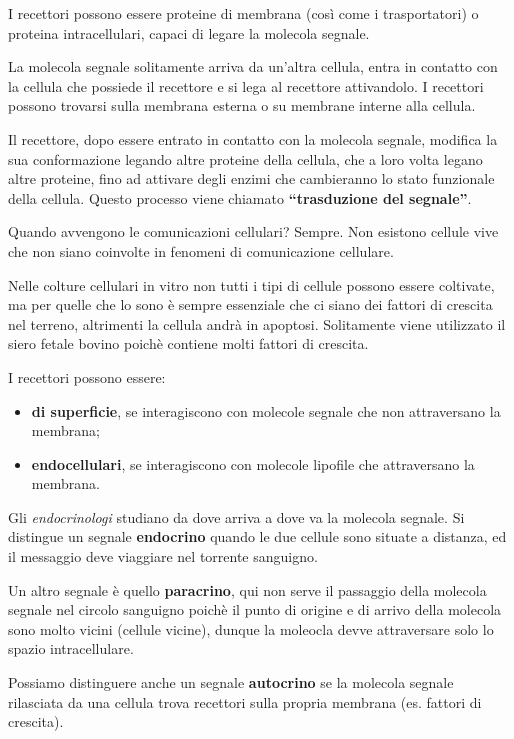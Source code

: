\documentclass[]{article}
\begin{document}
I recettori possono essere proteine di membrana (così come i
trasportatori) o proteina intracellulari, capaci di legare la molecola
segnale.

La molecola segnale solitamente arriva da un'altra cellula, entra in
contatto con la cellula che possiede il recettore e si lega al recettore
attivandolo. I recettori possono trovarsi sulla membrana esterna o su
membrane interne alla cellula.

Il recettore, dopo essere entrato in contatto con la molecola segnale,
modifica la sua conformazione legando altre proteine della cellula, che
a loro volta legano altre proteine, fino ad attivare degli enzimi che
cambieranno lo stato funzionale della cellula. Questo processo viene
chiamato \textbf{``trasduzione del segnale''}.

Quando avvengono le comunicazioni cellulari? Sempre. Non esistono
cellule vive che non siano coinvolte in fenomeni di comunicazione
cellulare.

Nelle colture cellulari in vitro non tutti i tipi di cellule possono
essere coltivate, ma per quelle che lo sono è sempre essenziale che ci
siano dei fattori di crescita nel terreno, altrimenti la cellula andrà
in apoptosi. Solitamente viene utilizzato il siero fetale bovino poichè
contiene molti fattori di crescita.

I recettori possono essere:

\begin{itemize}
\itemsep1pt\parskip0pt
\item
  \textbf{di superficie}, se interagiscono con molecole segnale che non
  attraversano la membrana;
\item
  \textbf{endocellulari}, se interagiscono con molecole lipofile che
  attraversano la membrana.
\end{itemize}

Gli \emph{endocrinologi} studiano da dove arriva a dove va la molecola
segnale. Si distingue un segnale \textbf{endocrino} quando le due
cellule sono situate a distanza, ed il messaggio deve viaggiare nel
torrente sanguigno.

Un altro segnale è quello \textbf{paracrino}, qui non serve il passaggio
della molecola segnale nel circolo sanguigno poichè il punto di origine
e di arrivo della molecola sono molto vicini (cellule vicine), dunque la
moleocla devve attraversare solo lo spazio intracellulare.

Possiamo distinguere anche un segnale \textbf{autocrino} se la molecola
segnale rilasciata da una cellula trova recettori sulla propria membrana
(es. fattori di crescita).
\end{document}
